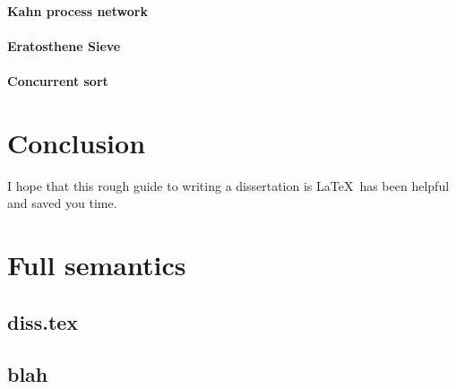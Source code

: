 \documentclass[12pt,twoside,notitlepage]{report}
\begin{document}
\subsubsection{Kahn process network}
\subsubsection{Eratosthene Sieve}
\subsubsection{Concurrent sort}
%

\cleardoublepage
\chapter{Conclusion}

I hope that this rough guide to writing a dissertation is \LaTeX\ has
been helpful and saved you time.




\cleardoublepage



\cleardoublepage

\appendix

\chapter{Full semantics}


\section{diss.tex}



\section{blah}

\end{document}
